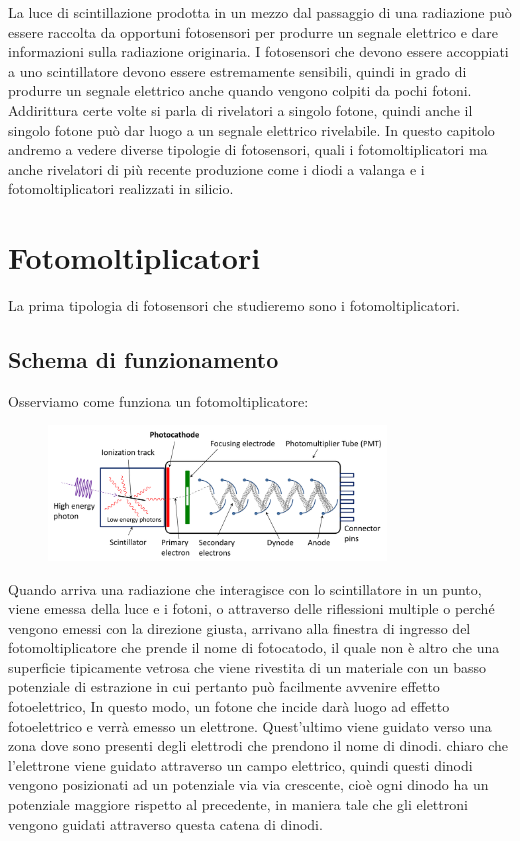La luce di scintillazione prodotta in un mezzo dal passaggio di una radiazione può essere raccolta da opportuni fotosensori per produrre un segnale elettrico e dare informazioni sulla radiazione originaria. I fotosensori che devono essere accoppiati a uno scintillatore devono essere estremamente sensibili, quindi in grado di produrre un segnale elettrico anche quando vengono colpiti da pochi fotoni. Addirittura certe volte si parla di rivelatori a singolo fotone, quindi anche il singolo fotone può dar luogo a un segnale elettrico rivelabile. In questo capitolo andremo a vedere diverse tipologie di fotosensori, quali i fotomoltiplicatori ma anche rivelatori di più recente produzione come i diodi a valanga e i fotomoltiplicatori realizzati in silicio.

\section{Fotomoltiplicatori}

La prima tipologia di fotosensori che studieremo sono i fotomoltiplicatori.

\subsection{Schema di funzionamento}

Osserviamo come funziona un fotomoltiplicatore:

\begin{figure}[H]
   \centering
   \includegraphics[width=0.8\textwidth]{immagini/fotomoltiplicatore.png}
\end{figure}

Quando arriva una radiazione che interagisce con lo scintillatore in un punto, viene emessa della luce e i fotoni, o attraverso delle riflessioni multiple o perché vengono emessi con la direzione giusta, arrivano alla finestra di ingresso del fotomoltiplicatore che prende il nome di fotocatodo, il quale non è altro che una superficie tipicamente vetrosa che viene rivestita di un materiale con un basso potenziale di estrazione in cui pertanto può facilmente avvenire effetto fotoelettrico, In questo modo, un fotone che incide darà luogo ad effetto fotoelettrico e verrà emesso un elettrone. Quest'ultimo viene guidato verso una zona dove sono presenti degli elettrodi che prendono il nome di dinodi. \E chiaro che l'elettrone viene guidato attraverso un campo elettrico, quindi questi dinodi vengono posizionati ad un potenziale via via crescente, cioè ogni dinodo ha un potenziale maggiore rispetto al precedente, in maniera tale che gli elettroni vengono guidati attraverso questa catena di dinodi.

